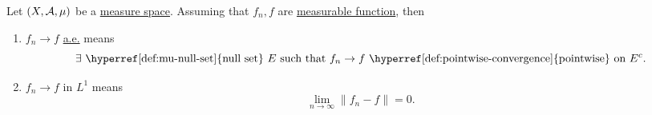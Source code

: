 \begin{definition}
	Let \((X, \mathcal{\MakeUppercase{a}} , \mu )\) be a \hyperref[def:measure-space]{measure space}. Assuming that \(f_{n}, f\) are \hyperref[def:measurable-function]{measurable function},
	then
	\begin{enumerate}
		\item \(f_{n}\to f\) \hyperref[def:mu-almost-everywhere]{a.e.} means
		      \[
			      \exists \text{ \hyperref[def:mu-null-set]{null set} } E\text{ such that } f_{n}\to f \text{ \hyperref[def:pointwise-convergence]{pointwise} on } E^{c}.
		      \]
		\item \(f_{n}\to f\) in \(L^1\) means
		      \[
			      \lim\limits_{n \to \infty} \left\lVert f_{n} - f\right\rVert = 0.
		      \]
	\end{enumerate}
\end{definition}
